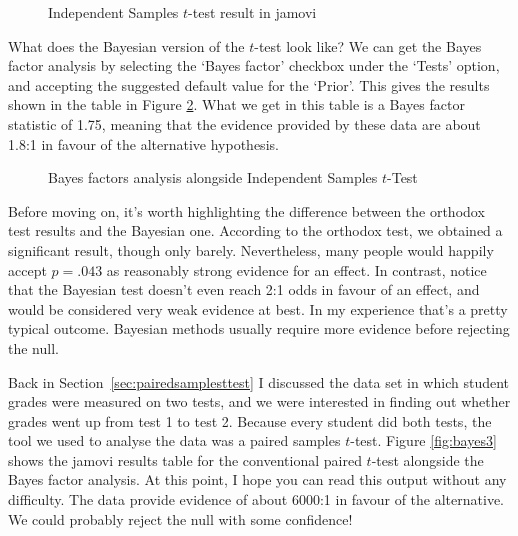 \begin{figure}[ht]
\begin{center}
\caption{Independent Samples $t$-test result in jamovi}
\label{fig:bayes1}
\HR
\end{center}
\end{figure}

What does the Bayesian version of the $t$-test look like? We can get the Bayes factor analysis by selecting the `Bayes factor' checkbox under the `Tests' option, and accepting the suggested default value for the `Prior'. This gives the results shown in the table in Figure \ref{fig:bayes2}. What we get in this table is a Bayes factor statistic of 1.75, meaning that the evidence provided by these data are about 1.8:1 in favour of the alternative hypothesis. 

\begin{figure}[ht]
\begin{center}
\caption{Bayes factors analysis alongside Independent Samples $t$-Test}
\label{fig:bayes2}
\HR
\end{center}
\end{figure}

Before moving on, it's worth highlighting the difference between the orthodox test results and the Bayesian one. According to the orthodox test, we obtained a significant result, though only barely. Nevertheless, many people would happily accept $p=.043$ as reasonably strong evidence for an effect. In contrast, notice that the Bayesian test doesn't even reach 2:1 odds in favour of an effect, and would be considered very weak evidence at best. In my experience that's a pretty typical outcome. Bayesian methods usually require more evidence before rejecting the null.


Back in Section~\ref{sec:pairedsamplesttest} I discussed the  data set in which student grades were measured on two tests, and we were interested in finding out whether grades went up from test 1 to test 2. Because every student did both tests, the tool we used to analyse the data was a paired samples $t$-test. Figure \ref{fig:bayes3} shows the jamovi results table for the conventional paired $t$-test alongside the Bayes factor analysis. At this point, I hope you can read this output without any difficulty. The data provide evidence of about 6000:1 in favour of the alternative. We could probably reject the null with some confidence!

